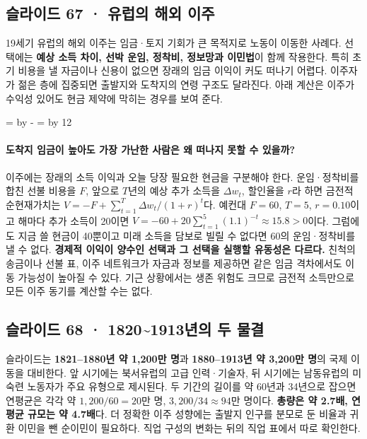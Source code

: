 \documentclass[10pt,a4paper]{article}
\newcommand{\ReserveQuestionSpace}{%
  \par\begingroup
  \dimen0=\pagegoal \advance\dimen0 by -\pagetotal
  \dimen2=\baselineskip \multiply\dimen2 by 12
  \ifdim\dimen0<\dimen2 \newpage\fi
  \endgroup}
\begin{document}
\subsection{슬라이드 67 · 유럽의 해외 이주}
19세기 유럽의 해외 이주는 임금·토지 기회가 큰 목적지로 노동이 이동한 사례다. 선택에는 \textbf{예상 소득 차이, 선박 운임, 정착비, 정보망과 이민법}이 함께 작용한다. 특히 초기 비용을 낼 자금이나 신용이 없으면 장래의 임금 이익이 커도 떠나기 어렵다. 이주자가 젊은 층에 집중되면 출발지와 도착지의 연령 구조도 달라진다. 아래 계산은 이주가 수익성 있어도 현금 제약에 막히는 경우를 보여 준다.\par

\ReserveQuestionSpace
\paragraph{도착지 임금이 높아도 가장 가난한 사람은 왜 떠나지 못할 수 있을까?}

이주에는 장래의 소득 이익과 오늘 당장 필요한 현금을 구분해야 한다. 운임·정착비를 합친 선불 비용을 $F$, 앞으로 $T$년의 예상 추가 소득을 $\Delta w_t$, 할인율을 $r$라 하면 금전적 순현재가치는 $V=-F+\sum_{t=1}^{T}\Delta w_t/(1+r)^t$다. 예컨대 $F=60$, $T=5$, $r=0.10$이고 해마다 추가 소득이 20이면 $V=-60+20\sum_{t=1}^{5}(1.1)^{-t}\approx15.8>0$이다. 그럼에도 지금 쓸 현금이 40뿐이고 미래 소득을 담보로 빌릴 수 없다면 60의 운임·정착비를 낼 수 없다. \textbf{경제적 이익이 양수인 선택과 그 선택을 실행할 유동성은 다르다.} 친척의 송금이나 선불 표, 이주 네트워크가 자금과 정보를 제공하면 같은 임금 격차에서도 이동 가능성이 높아질 수 있다. 기근 상황에서는 생존 위험도 크므로 금전적 소득만으로 모든 이주 동기를 계산할 수는 없다.\par

\subsection{슬라이드 68 · 1820\textasciitilde{}1913년의 두 물결}
슬라이드는 \textbf{1821–1880년 약 1,200만 명}과 \textbf{1880–1913년 약 3,200만 명}의 국제 이동을 대비한다. 앞 시기에는 북서유럽의 고급 인력·기술자, 뒤 시기에는 남동유럽의 미숙련 노동자가 주요 유형으로 제시된다. 두 기간의 길이를 약 60년과 34년으로 잡으면 연평균은 각각 약 $1{,}200/60=20$만 명, $3{,}200/34\approx94$만 명이다. \textbf{총량은 약 2.7배, 연평균 규모는 약 4.7배}다. 더 정확한 이주 성향에는 출발지 인구를 분모로 둔 비율과 귀환 이민을 뺀 순이민이 필요하다. 직업 구성의 변화는 뒤의 직업 표에서 따로 확인한다.\par
\end{document}
